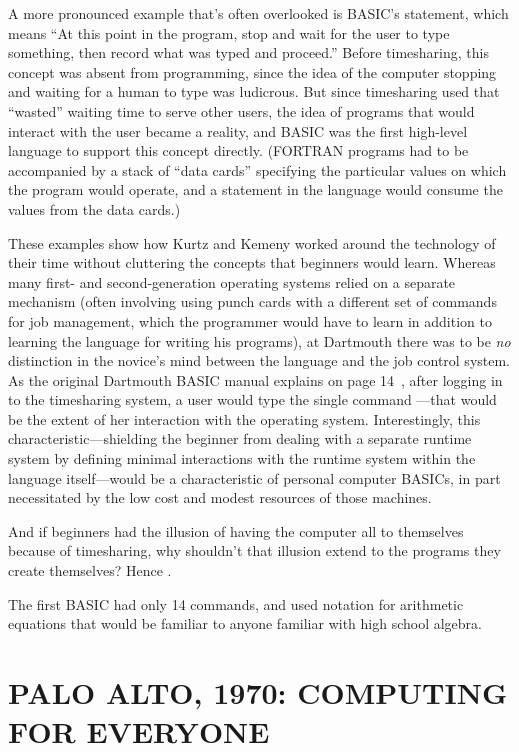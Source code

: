 \documentclass{article}
\begin{document}
A more pronounced example that's often overlooked is BASIC's 
statement, which means ``At this point in the program, stop and wait for
the user to type something, then record what was typed and proceed.''
Before timesharing, this concept was absent from programming, since the
idea of the computer stopping and waiting for a human to type was
ludicrous.  But since timesharing used that ``wasted'' waiting time to
serve other users, the idea of programs that would interact with the
user became a reality, and BASIC was the first high-level language to
support this concept directly.  (FORTRAN programs had to be accompanied
by a stack of ``data cards'' specifying the particular values on which
the program would operate, and a  statement in the language
would consume the values from the data cards.)

These examples show how Kurtz and Kemeny worked around the technology of their
time without cluttering the concepts that beginners would learn.
Whereas many first- and second-generation operating systems relied on a
separate  mechanism (often involving using punch cards
with a different set of commands for job management, which the
programmer would have to learn in addition to learning the language for
writing his programs),
at Dartmouth there was to be \emph{no} distinction in the
novice's mind between the language and the job control system.  As the
original Dartmouth BASIC manual explains on page
14~\cite{dartmouth_basic_manual}, after logging in to the timesharing
system, a user would type the single command ---that would be the
extent of her interaction with the operating system.  
Interestingly, this characteristic---shielding the beginner from dealing
with a separate runtime system by defining minimal interactions with the
runtime system within the language itself---would be a characteristic of
personal computer BASICs, in part necessitated by the low cost and
modest resources of those machines.

And if beginners had the illusion of having the computer all to
themselves because of timesharing, why shouldn't that illusion extend to
the programs they create themselves?  Hence .

The first BASIC had only 14 commands, and used notation for arithmetic
equations that would be familiar to anyone familiar with high school algebra.

\section{PALO ALTO, 1970: COMPUTING FOR EVERYONE}
\end{document}
